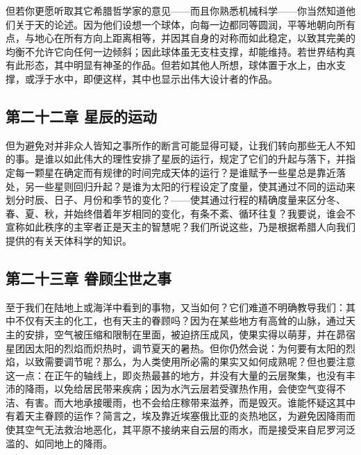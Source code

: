 但若你更愿听取其它希腊哲学家的意见——而且你熟悉机械科学——你当然知道他们关于天的论述。因为他们设想一个球体，向每一边都同等圆润，平等地朝向所有点，与地心在所有方向上距离相等，并因其自身的对称而如此稳定，以致其完美的均衡不允许它向任何一边倾斜；因此球体虽无支柱支撑，却能维持。若世界结构真有此形态，其中明显有神圣的作品。但若如其他人所想，球体置于水上，由水支撑，或浮于水中，即便这样，其中也显示出伟大设计者的作品。\par


\subsection{第二十二章 星辰的运动}

但为避免对并非众人皆知之事所作的断言可能显得可疑，让我们转向那些无人不知的事。是谁以如此伟大的理性安排了星辰的运行，规定了它们的升起与落下，并指定每一颗星在确定而有规律的时间完成天体的运行？是谁赋予一些星总是靠近落处，另一些星则回归升起？是谁为太阳的行程设定了度量，使其通过不同的运动来划分时辰、日子、月份和季节的变化？——使其通过行程的精确度量来区分冬、春、夏、秋，并始终借着年岁相同的变化，有条不紊、循环往复？我要说，谁会不宣称如此秩序的主宰者正是天主的智慧呢？我们所说这些，乃是根据希腊人向我们提供的有关天体科学的知识。\par


\subsection{第二十三章 眷顾尘世之事}

至于我们在陆地上或海洋中看到的事物，又当如何？它们难道不明确教导我们：其中不仅有天主的化工，也有天主的眷顾吗？因为在某些地方有高耸的山脉，通过天主的安排，空气被压缩和限制在里面，被迫挤压成风，使果实得以萌芽，并在昴宿星团因太阳的烈焰而炽热时，调节夏天的暑热。但你仍然会说：为何要有太阳的烈焰，以致需要调节呢？那么，为人类使用所必需的果实又如何成熟呢？但也要注意这一点：在正午的轴线上，即炎热最甚的地方，并没有大量的云层聚集，也没有丰沛的降雨，以免给居民带来疾病；因为水汽云层若受骤热作用，会使空气变得不洁、有害。而大地承接暖雨，也不会给庄稼带来滋养，而是毁灭。谁能怀疑这其中有着天主眷顾的运作？简言之，埃及靠近埃塞俄比亚的炎热地区，为避免因降雨而使其空气无法救治地恶化，其平原不接纳来自云层的雨水，而是接受来自尼罗河泛滥的、如同地上的降雨。\par

